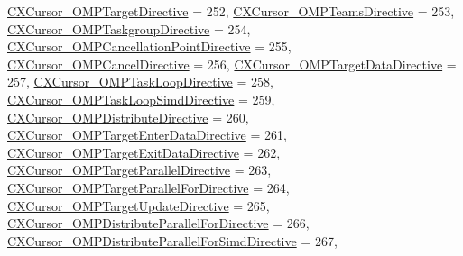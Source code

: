 \begin{DoxyCompactItemize}
\hyperlink{group__CINDEX_ggaaccc432245b4cd9f2d470913f9ef0013aab347e544298e6a7ad7e78b07791fc9d}{C\+X\+Cursor\+\_\+\+O\+M\+P\+Target\+Directive} = 252, 
\hyperlink{group__CINDEX_ggaaccc432245b4cd9f2d470913f9ef0013ada64e23dfff9ee56942eaf73ea6e5465}{C\+X\+Cursor\+\_\+\+O\+M\+P\+Teams\+Directive} = 253, 
\hyperlink{group__CINDEX_ggaaccc432245b4cd9f2d470913f9ef0013af07d58e74dbf248cac02369d9f6b1935}{C\+X\+Cursor\+\_\+\+O\+M\+P\+Taskgroup\+Directive} = 254, 
\newline
\hyperlink{group__CINDEX_ggaaccc432245b4cd9f2d470913f9ef0013a43551d6104fb8bd6e548ac05e3328363}{C\+X\+Cursor\+\_\+\+O\+M\+P\+Cancellation\+Point\+Directive} = 255, 
\hyperlink{group__CINDEX_ggaaccc432245b4cd9f2d470913f9ef0013a3cb3ecc4291d07f9013c2f051b885e8b}{C\+X\+Cursor\+\_\+\+O\+M\+P\+Cancel\+Directive} = 256, 
\hyperlink{group__CINDEX_ggaaccc432245b4cd9f2d470913f9ef0013aba9f40a74db71dad705701d98e92c760}{C\+X\+Cursor\+\_\+\+O\+M\+P\+Target\+Data\+Directive} = 257, 
\hyperlink{group__CINDEX_ggaaccc432245b4cd9f2d470913f9ef0013a4f48d2ae4bf7a94c5ed7b63597d928cd}{C\+X\+Cursor\+\_\+\+O\+M\+P\+Task\+Loop\+Directive} = 258, 
\newline
\hyperlink{group__CINDEX_ggaaccc432245b4cd9f2d470913f9ef0013a617d304589bfd3ce2ff3e68c3072e726}{C\+X\+Cursor\+\_\+\+O\+M\+P\+Task\+Loop\+Simd\+Directive} = 259, 
\hyperlink{group__CINDEX_ggaaccc432245b4cd9f2d470913f9ef0013a37d7946794504de65cec9fb8eb2dd8ff}{C\+X\+Cursor\+\_\+\+O\+M\+P\+Distribute\+Directive} = 260, 
\hyperlink{group__CINDEX_ggaaccc432245b4cd9f2d470913f9ef0013a149e7d403796d144dc5bd3e203810f3c}{C\+X\+Cursor\+\_\+\+O\+M\+P\+Target\+Enter\+Data\+Directive} = 261, 
\hyperlink{group__CINDEX_ggaaccc432245b4cd9f2d470913f9ef0013a63441bd563d6e1a5d2a14174a0a8faa4}{C\+X\+Cursor\+\_\+\+O\+M\+P\+Target\+Exit\+Data\+Directive} = 262, 
\newline
\hyperlink{group__CINDEX_ggaaccc432245b4cd9f2d470913f9ef0013ae955731bfa5030699c6db4cf84b4cf3c}{C\+X\+Cursor\+\_\+\+O\+M\+P\+Target\+Parallel\+Directive} = 263, 
\hyperlink{group__CINDEX_ggaaccc432245b4cd9f2d470913f9ef0013aaa76d8a8d66d33f2e685a2559abc6329}{C\+X\+Cursor\+\_\+\+O\+M\+P\+Target\+Parallel\+For\+Directive} = 264, 
\hyperlink{group__CINDEX_ggaaccc432245b4cd9f2d470913f9ef0013aea43eee9c4e76120f21652998e9cb0b4}{C\+X\+Cursor\+\_\+\+O\+M\+P\+Target\+Update\+Directive} = 265, 
\hyperlink{group__CINDEX_ggaaccc432245b4cd9f2d470913f9ef0013a5a3d4be5273be2aa9cdc4c0f032eabf8}{C\+X\+Cursor\+\_\+\+O\+M\+P\+Distribute\+Parallel\+For\+Directive} = 266, 
\newline
\hyperlink{group__CINDEX_ggaaccc432245b4cd9f2d470913f9ef0013a3d36e365eccd6b5d20e7bf4efc30e8ab}{C\+X\+Cursor\+\_\+\+O\+M\+P\+Distribute\+Parallel\+For\+Simd\+Directive} = 267, 

\end{DoxyCompactItemize}
